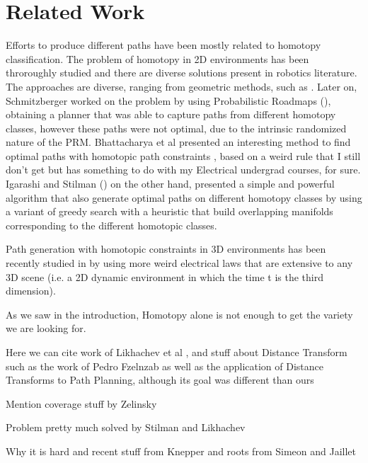 \documentclass[graybox]{svmult}
\begin{document}
\section{Related Work}
\label{sec:RelatedWork}
Efforts to produce different paths have been mostly related to homotopy classification. The problem of homotopy in 2D environments has been throroughly studied and there are diverse solutions present in robotics literature. The approaches are diverse, ranging from geometric methods, such as \cite{}. Later on, Schmitzberger worked on the problem by using Probabilistic Roadmaps (\cite{Schmitzberger2002Homo2D}), obtaining a planner that was able to capture paths from different homotopy classes, however these paths were not optimal, due to the intrinsic randomized nature of the PRM.
Bhattacharya et al presented an interesting method to find optimal paths with homotopic path constraints \cite{Bhattacharya2010Homotopy2D}, based on a weird rule that I still don't get but has something to do with my Electrical undergrad courses, for sure. Igarashi and Stilman (\cite{Igarashi2010Homotopy2D}) on the other hand, presented a simple and powerful algorithm that also generate optimal paths on different homotopy classes by using a variant of greedy search with a heuristic that build overlapping manifolds corresponding to the different homotopic classes.

Path generation with homotopic constraints in 3D environments has been recently studied in \cite{Bhattacharya2011Homotopy3D} by using more weird electrical laws that are extensive to any 3D scene (i.e. a 2D dynamic environment in which the time t is the third dimension).

As we saw in the introduction, Homotopy alone is not enough to get the variety we are looking for.
 
 
Here we can cite work of Likhachev et al \cite{Bhattacharya2011Homotopy3D}, and stuff about Distance Transform such as the work of Pedro Fzelnzab as well as the application of Distance Transforms to Path Planning, although its goal was different than ours

Mention coverage stuff by Zelinsky \cite{Zelinsky1993Coverage}

Problem pretty much solved by Stilman \cite{Igarashi2010Homotopy2D} and Likhachev \cite{Bhattacharya2010Homotopy2D}

Why it is hard and recent stuff from Knepper \cite{Knepper2012Equivalence} and roots from Simeon \cite{Simeon2000VisibilityPRM} and Jaillet \cite{Jaillet2008PathDeformation}
\end{document}
